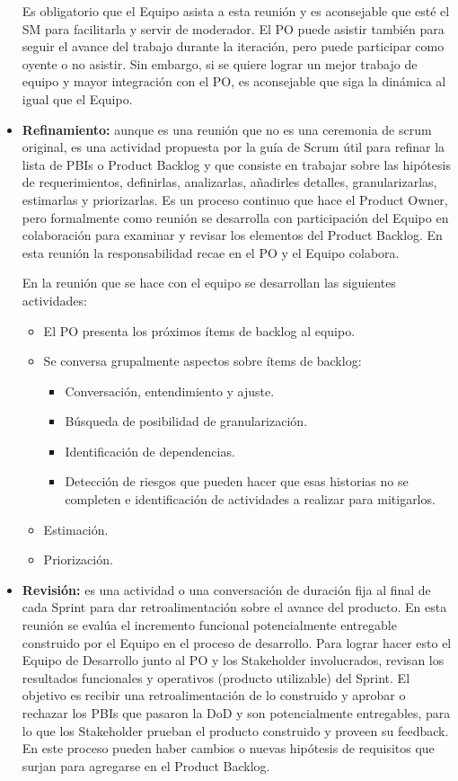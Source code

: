 \begin{itemize}
Es obligatorio que el Equipo asista a esta reunión y es aconsejable que esté el SM para facilitarla y servir de moderador. El PO puede asistir también para seguir el avance del trabajo durante la iteración, pero puede participar como oyente o no asistir. Sin embargo, si se quiere lograr un mejor trabajo de equipo y mayor integración con el PO, es aconsejable que siga la dinámica al igual que el Equipo.

\item \textbf{Refinamiento:} aunque es una reunión que no es una ceremonia de scrum original, es una actividad propuesta por la guía de Scrum útil para refinar la lista de PBIs o Product Backlog y que consiste en trabajar sobre las hipótesis de requerimientos, definirlas, analizarlas, añadirles detalles, granularizarlas, estimarlas y priorizarlas. Es un proceso continuo que hace el Product Owner, pero formalmente como reunión se desarrolla con participación del Equipo en colaboración para examinar y revisar los elementos del Product Backlog. En esta reunión la responsabilidad recae en el PO y el Equipo colabora.

En la reunión que se hace con el equipo se desarrollan las siguientes actividades:
  \begin{itemize}
  \item{El PO presenta los próximos ítems de backlog al equipo.}
  \item{Se conversa grupalmente aspectos sobre ítems de backlog: }
    \begin{itemize}
    \item{Conversación, entendimiento y ajuste.}
    \item{Búsqueda de posibilidad de granularización.}
    \item{Identificación de dependencias.}
    \item{Detección de riesgos que pueden hacer que esas historias no se completen e identificación de actividades a realizar para mitigarlos.}
    \end{itemize}
  \item{Estimación.}
  \item{Priorización.}
  \end{itemize}

\item \textbf{Revisión:} es una actividad o una conversación de duración fija al final de cada Sprint para dar retroalimentación sobre el avance del producto. En esta reunión se evalúa el incremento funcional potencialmente entregable construido por el Equipo en el proceso de desarrollo. Para lograr hacer esto el Equipo de Desarrollo junto al PO y los Stakeholder involucrados, revisan los resultados funcionales y operativos (producto utilizable) del Sprint. El objetivo es recibir una retroalimentación de lo construido y aprobar o rechazar los PBIs que pasaron la DoD y son potencialmente entregables, para lo que los Stakeholder prueban el producto construido y proveen su feedback. En este proceso pueden haber cambios o nuevas hipótesis de requisitos que surjan para agregarse en el Product Backlog.


\end{itemize}
